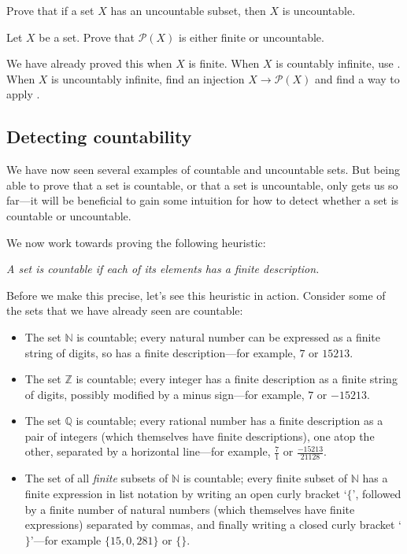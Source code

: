 \begin{exercise}
Prove that if a set $X$ has an uncountable subset, then $X$ is uncountable.
\end{exercise}

\begin{exercise}
\label{exPowerSetFiniteOrUncountable}
Let $X$ be a set. Prove that $\mathcal{P}(X)$ is either finite or uncountable.
\begin{backhint}
We have already proved this when $X$ is finite. When $X$ is countably infinite, use . When $X$ is uncountably infinite, find an injection $X \to \mathcal{P}(X)$ and find a way to apply .
\end{backhint}
\end{exercise}

\subsection*{Detecting countability}

We have now seen several examples of countable and uncountable sets. But being able to prove that a set is countable, or that a set is uncountable, only gets us so far---it will be beneficial to gain some intuition for how to detect whether a set is countable or uncountable.

We now work towards proving the following heuristic:

\begin{center}
\textit{A set is countable if each of its elements has a finite description.}
\end{center}

Before we make this precise, let's see this heuristic in action. Consider some of the sets that we have already seen are countable:
\begin{itemize}
\item The set $\mathbb{N}$ is countable; every natural number can be expressed as a finite string of digits, so has a finite description---for example, $7$ or $15213$.
\item The set $\mathbb{Z}$ is countable; every integer has a finite description as a finite string of digits, possibly modified by a minus sign---for example, $7$ or $-15213$.
\item The set $\mathbb{Q}$ is countable; every rational number has a finite description as a pair of integers (which themselves have finite descriptions), one atop the other, separated by a horizontal line---for example, $\frac{7}{1}$ or $\frac{-15213}{21128}$.
\item The set of all \textit{finite} subsets of $\mathbb{N}$ is countable; every finite subset of $\mathbb{N}$ has a finite expression in list notation by writing an open curly bracket `$\{$', followed by a finite number of natural numbers (which themselves have finite expressions) separated by commas, and finally writing a closed curly bracket `$\}$'---for example $\{ 15, 0, 281 \}$ or $\{ \}$.
\end{itemize}

